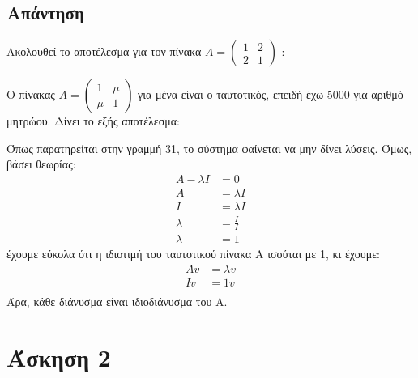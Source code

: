 \documentclass[a4paper,12pt]{article}
\begin{document}
\subsection{Απάντηση}
Ακολουθεί το αποτέλεσμα για τον πίνακα
$
    A=\begin{pmatrix}
        1 & 2 \\
        2 & 1
    \end{pmatrix}
$
:

Ο πίνακας
$
    A=\begin{pmatrix}
        1   & \mu \\
        \mu & 1
    \end{pmatrix}
$
για μένα είναι ο ταυτοτικός, επειδή έχω 5000 για αριθμό μητρώου. Δίνει το εξής αποτέλεσμα:

Όπως παρατηρείται στην γραμμή 31, το σύστημα φαίνεται να μην δίνει λύσεις. Όμως, βάσει θεωρίας:
\begin{equation}
    \begin{split}
        A - \lambda I &= 0 \\
        A &= \lambda I \\
        I &= \lambda I \\
        \lambda & =\frac{I}{I} \\
        \lambda & =1
    \end{split}
\end{equation}
έχουμε εύκολα ότι η ιδιοτιμή του ταυτοτικού  πίνακα Α ισούται με 1, κι έχουμε:
\begin{equation}
    \begin{split}
        A v &= \lambda v \\
        I v&= 1 v \\
    \end{split}
\end{equation}
Άρα, κάθε διάνυσμα είναι ιδιοδιάνυσμα του Α.
\newpage\section{Άσκηση 2}
\end{document}
